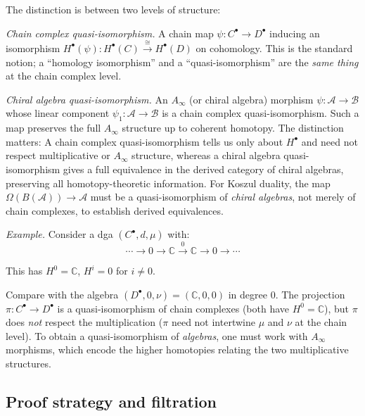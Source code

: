 \begin{remark}\label{rem:qi-vs-homology-iso}
The distinction is between two levels of structure:

\emph{Chain complex quasi-isomorphism.} A chain map $\psi: C^\bullet \to D^\bullet$ inducing an isomorphism $H^\bullet(\psi): H^\bullet(C) \xrightarrow{\cong} H^\bullet(D)$ on cohomology. This is the standard notion; a ``homology isomorphism'' and a ``quasi-isomorphism'' are the \emph{same thing} at the chain complex level.

\emph{Chiral algebra quasi-isomorphism.} An $A_\infty$ (or chiral algebra) morphism $\psi\colon \mathcal{A} \to \mathcal{B}$ whose linear component $\psi_1\colon \mathcal{A} \to \mathcal{B}$ is a chain complex quasi-isomorphism. Such a map preserves the full $A_\infty$ structure up to coherent homotopy. The distinction matters:
A chain complex quasi-isomorphism tells us only about $H^\bullet$ and need not respect multiplicative or $A_\infty$ structure, whereas a chiral algebra quasi-isomorphism gives a full equivalence in the derived category of chiral algebras, preserving all homotopy-theoretic information.  For Koszul duality, the map $\Omega(B(\mathcal{A})) \to \mathcal{A}$ must be a quasi-isomorphism of \emph{chiral algebras}, not merely of chain complexes, to establish derived equivalences.

\emph{Example.}
Consider a dga $(C^\bullet, d, \mu)$ with:
\[\cdots \to 0 \to \mathbb{C} \xrightarrow{0} \mathbb{C} \to 0 \to \cdots\]

This has $H^0 = \mathbb{C}$, $H^i = 0$ for $i \neq 0$.

Compare with the algebra $(D^\bullet, 0, \nu) = (\mathbb{C}, 0, 0)$ in degree 0.
The projection $\pi: C^\bullet \to D^\bullet$ is a quasi-isomorphism of chain
complexes (both have $H^0 = \mathbb{C}$), but $\pi$ does \emph{not} respect the
multiplication ($\pi$ need not intertwine $\mu$ and $\nu$ at the chain level).
To obtain a quasi-isomorphism of \emph{algebras}, one must work with $A_\infty$
morphisms, which encode the higher homotopies relating the two multiplicative
structures.
\end{remark}

\subsection{Proof strategy and filtration}

